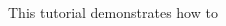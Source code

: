 

\begin{DoxyParagraph}{}
This tutorial demonstrates how to
\end{DoxyParagraph}

\begin{DoxyCode}{0}

\end{DoxyCode}
 